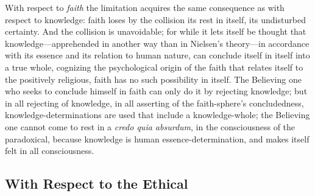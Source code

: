 \documentclass[12pt,a4paper]{book}
\begin{document}
With respect to \emph{faith} the limitation acquires the same consequence as with respect to knowledge: faith loses by the collision
its rest in itself, its undisturbed certainty. And the collision is unavoidable; for while it lets itself be thought that
knowledge---apprehended in another way than in Nielsen's theory---in accordance with its essence and its relation to human
nature, can conclude itself in itself into a true whole, cognizing the psychological origin of the faith that relates itself to
the positively religious, faith has no such possibility in itself. The Believing one who seeks to conclude himself in faith can
only do it by rejecting knowledge; but in all rejecting of knowledge, in all asserting of the faith-sphere's concludedness,
knowledge-determinations are used that include a knowledge-whole; the Believing one cannot come to rest in a \textit{credo quia
absurdum}, in the consciousness of the paradoxical, because knowledge is human essence-determination, and makes itself felt in
all consciousness.

\subsection{With Respect to the Ethical}
\label{ssec:conseq-ethical}
\end{document}
